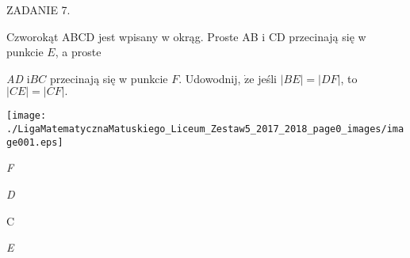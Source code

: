 \documentclass[a4paper,12pt]{article}
\begin{document}
ZADANIE 7.

Czworokąt ABCD jest wpisany w okrąg. Proste AB $\mathrm{i}$ CD przecinają się w punkcie $E$, a proste

{\it AD} $\mathrm{i}BC$ przecinają się w punkcie $F$. Udowodnij, $\dot{\mathrm{z}}\mathrm{e}$ jeśli $|BE|=|DF|$, to $|CE|=|CF|.$
\begin{center}
\texttt{[image: ./LigaMatematycznaMatuskiego\_Liceum\_Zestaw5\_2017\_2018\_page0\_images/image001.eps]}
\end{center}
{\it F}

{\it D}

C

{\it E}
\end{document}
